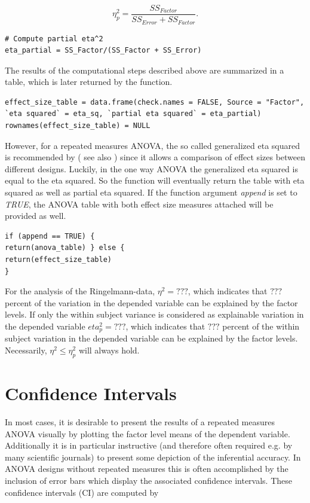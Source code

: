 \documentclass[11pt]{article}
\begin{document}
		\begin{equation}
		\eta^2_p = \frac{ SS_{Factor}}{SS_{Error} + SS_{Factor}}.
		\end{equation}
		
		\vspace{8 mm}
				
		\begin{lstlisting}
# Compute partial eta^2 
eta_partial = SS_Factor/(SS_Factor + SS_Error)
		\end{lstlisting}
		
		The results of the computational steps described above are summarized in a table, which is later returned by the function.\\
		
		\begin{lstlisting}
effect_size_table = data.frame(check.names = FALSE, Source = "Factor", `eta squared` = eta_sq, `partial eta squared` = eta_partial) rownames(effect_size_table) = NULL
		\end{lstlisting}
		
		However, for a repeated measures ANOVA, the so called generalized eta squared is recommended by \cite{bakeman2005recommended}( see also \citealp{olejnik2003generalized}) since it allows a comparison of effect sizes between different designs. Luckily, in the one way ANOVA the generalized eta squared is equal to the eta squared. So the function will eventually return the table with eta squared as well as partial eta squared. If the function
		argument \textit{append} is set to \textit{TRUE}, the ANOVA table with both effect size measures attached will be provided as well.\\
		
		\begin{lstlisting}
if (append == TRUE) {
return(anova_table) } else {
return(effect_size_table) 
}
		\end{lstlisting}
		
		For the analysis of the Ringelmann-data, $\eta^2=???$, which indicates that $???$ percent of the variation in the depended variable can be explained by the factor levels. If only the within subject variance is considered as explainable variation in the depended variable $eta^2_p=???$, which indicates that $???$ percent of the within subject variation in the depended variable can be explained by the factor levels. Necessarily, $\eta^2\leq\eta_𝑝^2$ will always hold.
		
		
		
	\section{Confidence Intervals}
		In most cases, it is desirable to present the results of a repeated measures ANOVA visually by plotting the factor level means of the dependent variable. Additionally it is in particular instructive (and therefore often required e.g. by many scientific journals) to present some depiction of the inferential accuracy. In ANOVA designs without repeated measures this is often accomplished by the inclusion of error bars which display the associated confidence intervals. These confidence intervals (CI) are computed by
		
\end{document}
